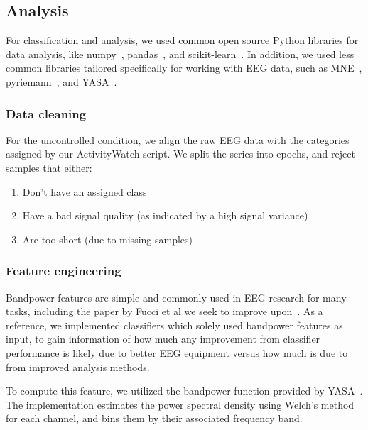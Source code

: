 \documentclass[a4paper]{article}
\begin{document}
\begin{refsection}
    \subsection{Analysis}

        For classification and analysis, we used common open source Python libraries for data analysis, like numpy~\cite{harris2020array}, pandas~\cite{reback2020pandas}, and scikit-learn~\cite{scikit-learn}. In addition, we used less common libraries tailored specifically for working with EEG data, such as MNE~\cite{noauthor_mne-toolsmne-python_2020}, pyriemann~\cite{alexandre_barachant_2020_3715511}, and YASA~\cite{raphael_vallat_raphaelvallatyasa_2020}.

        \subsubsection{Data cleaning}

            For the uncontrolled condition, we align the raw EEG data with the categories assigned by our ActivityWatch script. We split the series into epochs, and reject samples that either:

            \begin{enumerate}
                \item Don't have an assigned class
                \item Have a bad signal quality (as indicated by a high signal variance)
                \item Are too short (due to missing samples)
            \end{enumerate}


        \subsubsection{Feature engineering}

            Bandpower features are simple and commonly used in EEG research for many tasks, including the paper by Fucci et al we seek to improve upon~\cite{fucci_replication_2019}. As a reference, we implemented classifiers which solely used bandpower features as input, to gain information of how much any improvement from classifier performance is likely due to better EEG equipment versus how much is due to from improved analysis methods.

            To compute this feature, we utilized the bandpower function provided by YASA~\cite{raphael_vallat_raphaelvallatyasa_2020}. The implementation estimates the power spectral density using Welch's method for each channel, and bins them by their associated frequency band.


\end{refsection}
\end{document}
